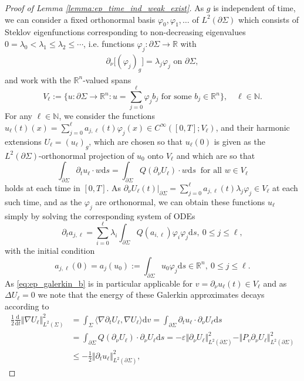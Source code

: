 \documentclass[10pt,reqno]{amsart}
\theoremstyle{plain}
\theoremstyle{definition}
\numberwithin{equation}{section}
\newcommand{\Si}{\Sigma}
\newcommand{\vph}{\varphi}
\newcommand{\ep}{\varepsilon}
\newcommand{\De}{\Delta}
\newcommand{\R}{\ensuremath{{\mathbb R}}}
\newcommand{\N}{\ensuremath{{\mathbb N}}}
\newcommand{\norm}[1]{\Vert#1\Vert}
\newcommand{\beq}{\begin{equation}}
\newcommand{\eeq}{\end{equation}}
\newcommand{\beqs}{\begin{equation*}}
\newcommand{\eeqs}{\end{equation*}}
\newcommand{\half}{\frac{1}{2}}
\newcommand{\dd}{\mathrm{d}} %
\newcommand{\pSi}{{\partial \Sigma}}
\newcommand{\hf}{\frac{1}{2}} %
\newcommand{\p}{\partial} %
\newcommand{\inner}[2]{\langle #1, #2\rangle} %
\newcommand{\la}{\lambda} %
\begin{document}
\begin{proof}[Proof of Lemma \ref{lemma:ep_time_ind_weak_exist}]
    As $g$ is independent of time, we can consider a fixed orthonormal basis $\vph_0,\vph_1,\ldots$ of $L^2(\pSi)$ which consists of Steklov eigenfunctions corresponding to non-decreasing eigenvalues $0 = \la_0 < \la_1 \leq \la_2 \leq \cdots $, i.e. functions $\vph_j:\pSi\to \R$ with
    \begin{align*}
    	\p_{\nu}\big[ (\vph_j)_g\big] = \la_j \vph_j \text{ on }\p\Si,
    \end{align*}
    and work with the $\R^n$-valued spans
    \beqs
        V_\ell := \big\{u:\pSi\to \R^n: u=\sum_{j=0}^\ell\varphi_j b_j \text{ for some } b_j\in\R^n\big\},\quad \ell \in \N.
    \eeqs
    For any $\ell\in\N$, we consider the functions $u_\ell(t)(x)= \sum_{j=0}^\ell a_{j,\ell}(t)\vph_j(x) \in C^\infty([0,T];V_\ell)$, and their harmonic extensions $U_\ell=(u_\ell)_g$, which are chosen so that  $u_\ell(0)$ is given as the $L^2(\pSi)$-orthonormal projection of $u_0$ onto $V_\ell$ and which are so that
    \beq\label{eq:ep_galerkin_b}
        \int_{\p\Si}\p_t u_\ell\cdot w\dd s = \int_{\p\Si}Q(\p_{\nu} U_\ell) \cdot w\dd s\ \text{ for all }w\in V_\ell
    \eeq
    holds at each time in $[0,T]$. As $\p_{\nu}U_\ell(t)\vert_{\pSi} = \sum_{j=0}^\ell a_{j,\ell}(t)\la_j \vph_j \in V_\ell$ at each such time, and as the $\vph_j$ are orthonormal, we can obtain these functions $u_\ell$ simply by solving the corresponding system of ODEs %
    \beqs
        \p_ta_{j,\ell} = \sum_{i=0}^\ell \la_i\int_{\p\Si}Q(a_{i,\ell})\vph_i\vph_j\dd s,\ 0\le j\le\ell,
    \eeqs
    with the initial condition
    \beqs
        a_{j,\ell}(0) =a_j(u_0):= \int_{\p\Si}u_0\vph_j \dd s\in \R^n,\ 0\le j\le\ell.
    \eeqs
    As \eqref{eq:ep_galerkin_b} is in particular applicable for $v=\p_\nu u_\ell(t)\in V_\ell$ and as $\De U_\ell=0$ we note that the energy of these Galerkin approximates decays according to     
    \begin{align}\label{est:galerkin_uniform_bound}
        \hf\frac{\dd}{\dd t}\norm{\nabla U_\ell}_{L^2(\Si)}^2 &= \int_\Si\inner{\nabla\p_t U_\ell}{\nabla U_\ell}\dd v = \int_{\p\Si}\p_tu_\ell\cdot\p_{\nu}U_\ell\dd s\nonumber\\
        & = \int_{\p\Si}Q(\p_{\nu}U_\ell)\cdot\p_{\nu}U_\ell\dd s = -\ep\norm{\p_{\nu}U_\ell}_{L^2(\p\Si)}^2-\norm{P_{v}\p_{\nu}U_\ell}_{L^2(\p\Si)}^2\\
        & \le -\half\norm{\p_t u_\ell}_{L^2(\p\Si)}^2,\nonumber

\end{align}
\end{proof}
\end{document}
